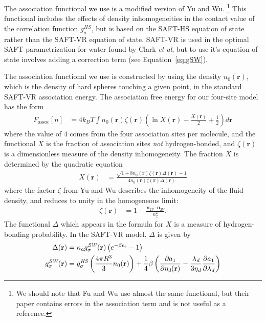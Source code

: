 \documentclass[letterpaper,twocolumn,amsmath,amssymb,prb]{revtex4-1}
\newcommand{\xx}{\textbf{r}}
\begin{document}
The association functional we use is a modified version of Yu
and Wu.\cite{yu2002fmt-dft-inhomogeneous-associating} \footnote{We
  should note that Fu and Wu\cite{fu2005vapor-liquid-dft} use almost
  the same functional, but their paper contains errors in the
  association term and is not useful as a reference.} 
This functional includes the effects of density inhomogeneities in the
contact value of the correlation function $g^{HS}_\sigma$, but is
based on the SAFT-HS equation of state rather than the SAFT-VR
equation of state\cite{gil-villegas-1997-SAFT-VR}. SAFT-VR is used in the
optimal SAFT parametrization for water found by Clark \emph{et
  al}\cite{clark2006developing}, but to use it's
equation of state involves adding a correction term (see
Equation~\ref{eq:gSW}).

The association functional we use is constructed by using the density
$n_0(\xx)$, which is the density of hard spheres touching a given
point, in the standard SAFT-VR association
energy\cite{gil-villegas-1997-SAFT-VR}.
The association free energy for our four-site model has the form
\begin{align}
  F_\text{assoc}[n] &= 4 k_BT \int n_0(\xx) \zeta(\xx)
  \left(\ln X(\xx) - \frac{X(\xx)}{2} + \frac12\right) d\xx
\end{align}
where the value of $4$ comes from the four association sites per
molecule, and the functional $X$ is the fraction of association sites
\emph{not} hydrogen-bonded, and $\zeta(\xx)$ is a dimensionless
measure of the density inhomogeneity.
%
The fraction $X$ is determined by the quadratic equation
\begin{align}
  X(\xx) &= \frac{\sqrt{1 + 8n_0(\xx)\zeta(\xx)
      \Delta(\xx)} - 1}
  {4 n_0(\xx)\zeta(\xx)
    \Delta(\xx)}
\end{align}
where the factor $\zeta$ from Yu and
Wu\cite{yu2002fmt-dft-inhomogeneous-associating} describes the
inhomogeneity of the fluid density, and reduces to unity in the
homogeneous limit:
\begin{align}
  \zeta(\xx) &= 1 - \frac{\mathbf{n}_{2V}\cdot\mathbf{n}_{2V}}{n_2^2}.
\end{align}
The functional $\Delta$ which appears in the formula for $X$ is a
measure of hydrogen-bonding probability.  In the SAFT-VR
model\cite{gil-villegas-1997-SAFT-VR}, $\Delta$ is given by
\begin{align}
  \Delta(\xx) &= \kappaassoc g^\textit{SW}_\sigma(\xx)
  \left(e^{-\beta\epsilonassoc} - 1\right) \\
  g^\textit{SW}_\sigma(\xx) &= g^\textit{HS}_\sigma\left(\frac{4\pi R^3}{3}n_0(\xx)\right) +
  \frac{1}{4}\beta\left(\frac{\partial a_1}{\partial \etadisp(\xx)} -
  \frac{\lambdadisp}{3 \etadisp}\frac{\partial a_1}{\partial \lambdadisp}\right)\label{eq:gSW}
\end{align}
\end{document}
